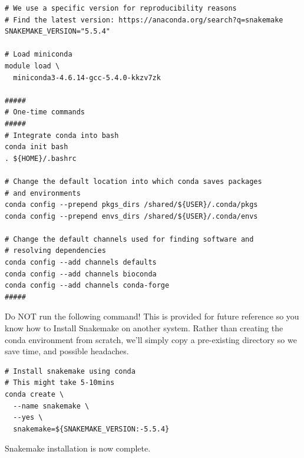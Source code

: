 \begin{steps}
\begin{lstlisting}
# We use a specific version for reproducibility reasons
# Find the latest version: https://anaconda.org/search?q=snakemake
SNAKEMAKE_VERSION="5.5.4"

# Load miniconda
module load \
  miniconda3-4.6.14-gcc-5.4.0-kkzv7zk

#####
# One-time commands
#####
# Integrate conda into bash
conda init bash
. ${HOME}/.bashrc

# Change the default location into which conda saves packages
# and environments
conda config --prepend pkgs_dirs /shared/${USER}/.conda/pkgs
conda config --prepend envs_dirs /shared/${USER}/.conda/envs

# Change the default channels used for finding software and
# resolving dependencies
conda config --add channels defaults
conda config --add channels bioconda
conda config --add channels conda-forge
#####
\end{lstlisting}

\end{steps}

\begin{warning}

Do NOT run the following command! This is provided for future reference so you know how to Install Snakemake on another system. Rather than
creating the conda environment from scratch, we'll simply copy a pre-existing directory so we save time, and possible headaches.

\begin{lstlisting}
# Install snakemake using conda
# This might take 5-10mins
conda create \
  --name snakemake \
  --yes \
  snakemake=${SNAKEMAKE_VERSION:-5.5.4}
\end{lstlisting}

Snakemake installation is now complete.

\end{warning}

